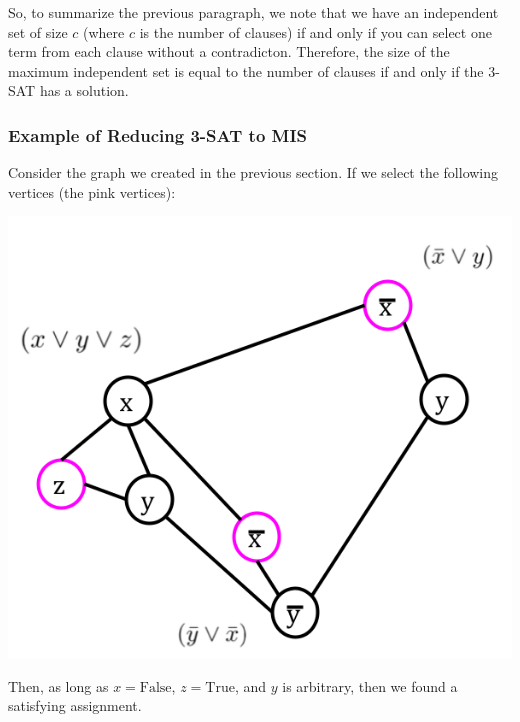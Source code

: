 \documentclass[letterpaper]{article}
\begin{document}
\bigskip 

So, to summarize the previous paragraph, we note that we have an independent set of size $c$ (where $c$ is the number of clauses) if and only if you can select one term from each clause without a contradicton. Therefore, the size of the maximum independent set is equal to the number of clauses if and only if the 3-SAT has a solution. 

\subsubsection{Example of Reducing 3-SAT to MIS}
Consider the graph we created in the previous section. If we select the following vertices (the pink vertices): 
\begin{center}
    \includegraphics[scale=0.4]{../assets/3sat_mis_4.png}
\end{center}
Then, as long as $x = \text{False}$, $z = \text{True}$, and $y$ is arbitrary, then we found a satisfying assignment. 
\end{document}
